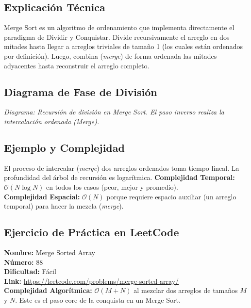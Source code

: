 \documentclass[12pt]{article}
\begin{document}
\subsection{Explicación Técnica}
Merge Sort es un algoritmo de ordenamiento que implementa directamente el paradigma de Dividir y Conquistar. Divide recursivamente el arreglo en dos mitades hasta llegar a arreglos triviales de tamaño 1 (los cuales están ordenados por definición). Luego, combina (\textit{merge}) de forma ordenada las mitades adyacentes hasta reconstruir el arreglo completo.

\subsection{Diagrama de Fase de División}
\begin{center}
\end{center}
\textit{Diagrama: Recursión de división en Merge Sort. El paso inverso realiza la intercalación ordenada (Merge).}

\subsection{Ejemplo y Complejidad}
El proceso de intercalar (\textit{merge}) dos arreglos ordenados toma tiempo lineal. La profundidad del árbol de recursión es logarítmica.
\textbf{Complejidad Temporal:} $\mathcal{O}(N \log N)$ en todos los casos (peor, mejor y promedio). \\
\textbf{Complejidad Espacial:} $\mathcal{O}(N)$ porque requiere espacio auxiliar (un arreglo temporal) para hacer la mezcla (\textit{merge}).

\subsection{Ejercicio de Práctica en LeetCode}
\textbf{Nombre:} Merge Sorted Array \\
\textbf{Número:} 88 \\
\textbf{Dificultad:} Fácil \\
\textbf{Link:} \url{https://leetcode.com/problems/merge-sorted-array/} \\
\textbf{Complejidad Algorítmica:} $\mathcal{O}(M + N)$ al mezclar dos arreglos de tamaños $M$ y $N$. Este es el paso core de la conquista en un Merge Sort.
\end{document}
